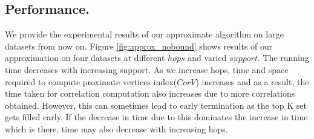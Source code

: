 

\subsection{Performance.}
We provide the experimental results of our approximate algorithm on large datasets from now on. 
\newline
\newline
{} Figure \ref{fig:approx_nobound} shows results of our approximation on four datasets at different $hops$ and varied $support$. The running time decreases with increasing support. As we increase hops, time and space required to compute proximate vertices index($CorV$) increases and as a result, the time taken for correlation computation also increases due to more correlations obtained. However, this can  sometimes lead to early termination as the top K set gets filled early. If the decrease in time due to this dominates the increase in time which is there, time may also decrease with increasing hops.


